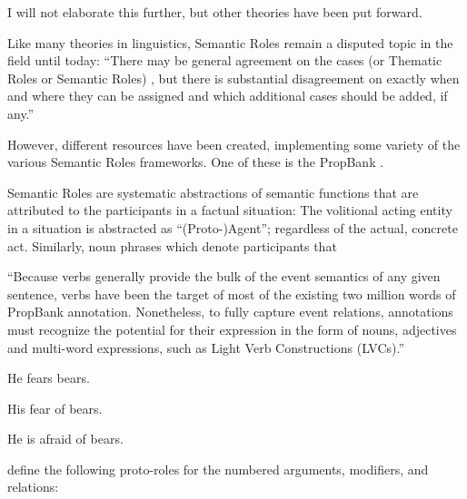 {\color{red} I will not elaborate this further, but other theories have been put forward.}

Like many theories in linguistics, Semantic Roles remain a disputed topic in the field until today:
``There may be general agreement on the cases (or Thematic Roles or Semantic Roles) \textelp{},
but there is substantial disagreement on exactly when and where they can be assigned and which
additional cases should be added, if any.'' \citep{palmer2010semantic}


However, different resources have been created, implementing some variety of the various Semantic Roles frameworks.
One of these is the PropBank \citep{kingsbury2002treebank}.


Semantic Roles are systematic abstractions of semantic functions that are attributed to the participants
in a factual situation: The volitional acting entity in a situation is abstracted as ``(Proto-)Agent''; regardless
of the actual, concrete act. Similarly, noun phrases which denote participants that

``Because verbs generally provide the bulk of the event semantics of any given sentence, verbs have
been the target of most of the existing two million words of PropBank annotation. Nonetheless,
to fully capture event relations, annotations must recognize the potential for their expression
in the form of nouns, adjectives and multi-word expressions, such as Light Verb Constructions
(LVCs).'' \citep[p.~3014]{bonial2014propbank}

\begin{examples}
  \item He fears bears.
  \item His fear of bears.
  \item He is afraid of bears.
\end{examples}

\cite{bonial2012english} define the following proto-roles for the numbered arguments, modifiers,
and relations:

